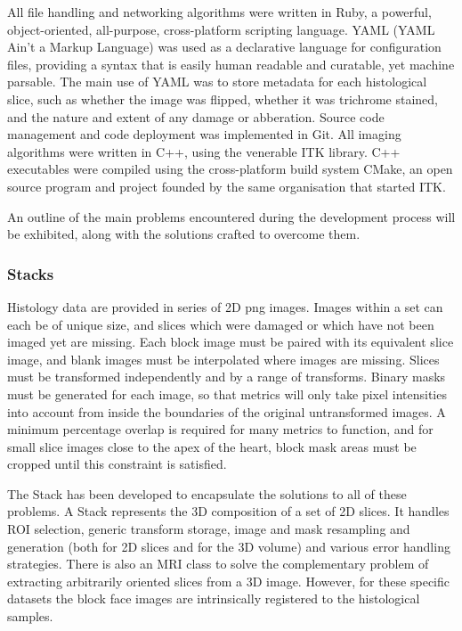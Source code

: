     All file handling and networking algorithms were written in Ruby, a powerful, object-oriented, all-purpose, cross-platform scripting language. YAML (YAML Ain't a Markup Language) was used as a declarative language for configuration files, providing a syntax that is easily human readable and curatable, yet machine parsable. The main use of YAML was to store metadata for each histological slice, such as whether the image was flipped, whether it was trichrome stained, and the nature and extent of any damage or abberation. Source code management and code deployment was implemented in Git. All imaging algorithms were written in C++, using the venerable ITK library. C++ executables were compiled using the cross-platform build system CMake, an open source program and project founded by the same organisation that started ITK.
    
    An outline of the main problems encountered during the development process will be exhibited, along with the solutions crafted to overcome them.
    \subsubsection{Stacks} %
    \label{ssub:stacks}
            Histology data are provided in series of 2D png images. Images within a set can each be of unique size, and slices which were damaged or which have not been imaged yet are missing. Each block image must be paired with its equivalent slice image, and blank images must be interpolated where images are missing. Slices must be transformed independently and by a range of transforms. Binary masks must be generated for each image, so that metrics will only take pixel intensities into account from inside the boundaries of the original untransformed images. A minimum percentage overlap is required for many metrics to function, and for small slice images close to the apex of the heart, block mask areas must be cropped until this constraint is satisfied.

            The Stack has been developed to encapsulate the solutions to all of these problems. A Stack represents the 3D composition of a set of 2D slices. It handles ROI selection, generic transform storage, image and mask resampling and generation (both for 2D slices and for the 3D volume) and various error handling strategies. There is also an MRI class to solve the complementary problem of extracting arbitrarily oriented slices from a 3D image. However, for these specific datasets the block face images are intrinsically registered to the histological samples.
    
